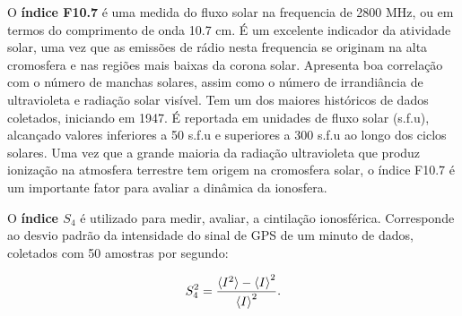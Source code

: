 O {\bf índice F10.7} é uma medida do fluxo solar na frequencia de 2800 MHz, ou em termos do comprimento de onda 10.7 cm. É um excelente indicador da atividade solar, uma vez que as emissões de rádio nesta frequencia se originam na alta cromosfera e nas regiões mais baixas da corona solar. Apresenta boa correlação com o número de manchas solares, assim como o número de irrandiância de ultravioleta e radiação solar visível. Tem um dos maiores históricos de dados coletados, iniciando em 1947. É reportada em unidades de fluxo solar (s.f.u), alcançado valores inferiores a 50 s.f.u e superiores a 300 s.f.u ao longo dos ciclos solares. Uma vez que a grande maioria da radiação ultravioleta que produz ionização na atmosfera terrestre tem origem na cromosfera solar, o índice F10.7 é um importante fator para avaliar a dinâmica da ionosfera.



O {\bf índice $S_4$} é utilizado para medir, avaliar, a cintilação ionosférica. Corresponde ao desvio padrão da intensidade do sinal de GPS de um minuto de dados, coletados com 50 amostras por segundo:

\begin{equation}
    S_4^2=\frac{\braket{I^2}-\braket{I}^2}{\braket{I}^2}\mbox{.}
\end{equation}
